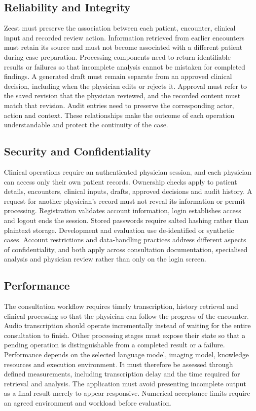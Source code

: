 \subsection{Reliability and Integrity}
Zeest must preserve the association between each patient, encounter, clinical input and recorded review action. Information retrieved from earlier encounters must retain its source and must not become associated with a different patient during case preparation. Processing components need to return identifiable results or failures so that incomplete analysis cannot be mistaken for completed findings. A generated draft must remain separate from an approved clinical decision, including when the physician edits or rejects it. Approval must refer to the saved revision that the physician reviewed, and the recorded content must match that revision. Audit entries need to preserve the corresponding actor, action and context. These relationships make the outcome of each operation understandable and protect the continuity of the case.

\subsection{Security and Confidentiality}
Clinical operations require an authenticated physician session, and each physician can access only their own patient records. Ownership checks apply to patient details, encounters, clinical inputs, drafts, approved decisions and audit history. A request for another physician's record must not reveal its information or permit processing. Registration validates account information, login establishes access and logout ends the session. Stored passwords require salted hashing rather than plaintext storage.\cite{zeestA:owaspPasswords} Development and evaluation use de-identified or synthetic cases. Account restrictions and data-handling practices address different aspects of confidentiality, and both apply across consultation documentation, specialised analysis and physician review rather than only on the login screen.

\subsection{Performance}
The consultation workflow requires timely transcription, history retrieval and clinical processing so that the physician can follow the progress of the encounter. Audio transcription should operate incrementally instead of waiting for the entire consultation to finish. Other processing stages must expose their state so that a pending operation is distinguishable from a completed result or a failure. Performance depends on the selected language model, imaging model, knowledge resources and execution environment. It must therefore be assessed through defined measurements, including transcription delay and the time required for retrieval and analysis. The application must avoid presenting incomplete output as a final result merely to appear responsive. Numerical acceptance limits require an agreed environment and workload before evaluation.

